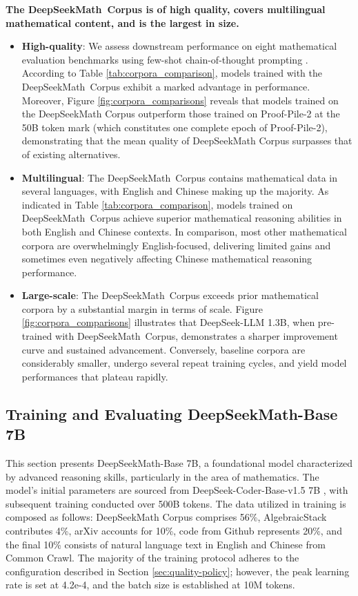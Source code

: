 \begin{itemize}[topsep=0pt]
\textbf{The DeepSeekMath~Corpus is of high quality, covers multilingual mathematical content, and is the largest in size.}

\begin{itemize}[topsep=0pt]
    \item \textbf{High-quality}:
    We assess downstream performance on eight mathematical evaluation benchmarks using few-shot chain-of-thought prompting \cite{cot}. According to Table \ref{tab:corpora_comparison}, models trained with the DeepSeekMath~Corpus exhibit a marked advantage in performance. Moreover, Figure \ref{fig:corpora_comparisons} reveals that models trained on the DeepSeekMath Corpus outperform those trained on Proof-Pile-2 at the 50B token mark (which constitutes one complete epoch of Proof-Pile-2), demonstrating that the mean quality of DeepSeekMath Corpus surpasses that of existing alternatives.
    \item \textbf{Multilingual}:
    The DeepSeekMath~Corpus contains mathematical data in several languages, with English and Chinese making up the majority. As indicated in Table \ref{tab:corpora_comparison}, models trained on DeepSeekMath~Corpus achieve superior mathematical reasoning abilities in both English and Chinese contexts. In comparison, most other mathematical corpora are overwhelmingly English-focused, delivering limited gains and sometimes even negatively affecting Chinese mathematical reasoning performance.
    \item \textbf{Large-scale}:
    The DeepSeekMath~Corpus exceeds prior mathematical corpora by a substantial margin in terms of scale. Figure \ref{fig:corpora_comparisons} illustrates that DeepSeek-LLM 1.3B, when pre-trained with DeepSeekMath~Corpus, demonstrates a sharper improvement curve and sustained advancement. Conversely, baseline corpora are considerably smaller, undergo several repeat training cycles, and yield model performances that plateau rapidly.
\end{itemize}

\subsection{Training and Evaluating DeepSeekMath-Base 7B}

This section presents DeepSeekMath-Base 7B, a foundational model characterized by advanced reasoning skills, particularly in the area of mathematics. The model’s initial parameters are sourced from DeepSeek-Coder-Base-v1.5 7B \citep{deepseek-coder}, with subsequent training conducted over 500B tokens. The data utilized in training is composed as follows: DeepSeekMath Corpus comprises 56\%, AlgebraicStack contributes 4\%, arXiv accounts for 10\%, code from Github represents 20\%, and the final 10\% consists of natural language text in English and Chinese from Common Crawl. The majority of the training protocol adheres to the configuration described in Section \ref{sec:quality-policy}; however, the peak learning rate is set at 4.2e-4, and the batch size is established at 10M tokens.


\end{itemize}
